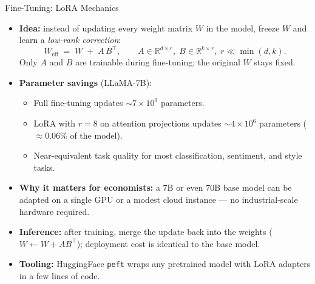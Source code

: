 \documentclass[10pt,english,aspectratio=169]{beamer}
\begin{document}
\begin{frame}{Fine-Tuning: LoRA Mechanics}
\begin{itemize}
\item \textbf{Idea:} instead of updating every weight matrix $W$ in the model, freeze $W$ and learn a \emph{low-rank correction}:
\[
   W_{\text{eff}} \;=\; W \;+\; A\,B^{\top}, \qquad A \in \mathbb{R}^{d \times r},\; B \in \mathbb{R}^{k \times r},\; r \ll \min(d, k).
\]
Only $A$ and $B$ are trainable during fine-tuning; the original $W$ stays fixed.

\medskip
\item \textbf{Parameter savings} (LLaMA-7B):
\begin{itemize}
    \item Full fine-tuning updates $\sim\!7 \times 10^{9}$ parameters.
    \item LoRA with $r = 8$ on attention projections updates $\sim\!4 \times 10^{6}$ parameters ($\approx 0.06\%$ of the model).
    \item Near-equivalent task quality for most classification, sentiment, and style tasks.
\end{itemize}

\medskip
\item \textbf{Why it matters for economists:} a 7B or even 70B base model can be adapted on a single GPU or a modest cloud instance --- no industrial-scale hardware required.

\medskip
\item \textbf{Inference:} after training, merge the update back into the weights ($W \leftarrow W + A B^{\top}$); deployment cost is identical to the base model.

\medskip
\item \textbf{Tooling:} HuggingFace \texttt{peft} wraps any pretrained model with LoRA adapters in a few lines of code.
\end{itemize}
\end{frame}
\end{document}
